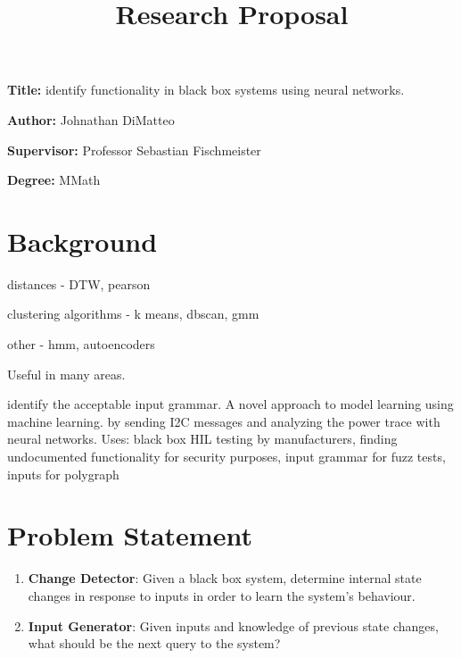 \documentclass[12pt, a4paper]{article}
\title{Research Proposal}
\author{}
\date{}
\newcommand{\namelistlabel}[1]{\mbox{#1}\hfil}
\newenvironment{namelist}[1]{%
\begin{list}{}
    {
        \let\makelabel\namelistlabel
        \settowidth{\labelwidth}{#1}
        \setlength{\leftmargin}{1.1\labelwidth}
    }
  }{%
\end{list}}
\begin{document}
\maketitle

\begin{namelist}{xxxxxxxxxxxx}
\item[{\bf Title:}]
	identify functionality in black box systems using neural networks.
\item[{\bf Author:}]
	Johnathan DiMatteo
\item[{\bf Supervisor:}]
	Professor Sebastian Fischmeister
\item[{\bf Degree:}]
	MMath
\end{namelist}

\section*{Background} 
distances - DTW, pearson

clustering algorithms - k means, dbscan, gmm

other - hmm, autoencoders

Useful in many areas.

identify the acceptable input grammar. 
A novel approach to model learning using machine learning.
by sending I2C messages and analyzing the power trace with neural networks.
Uses: black box HIL testing by manufacturers, finding undocumented functionality for security purposes, input grammar for fuzz tests, inputs for polygraph


\section*{Problem Statement} 

\begin{enumerate}
    \item \textbf{Change Detector}: Given a black box system, determine internal state changes in response to inputs in order to learn the system's behaviour.
    \item \textbf{Input Generator}: Given inputs and knowledge of previous state changes, what should be the next query to the system?
\end{enumerate}
\end{document}
